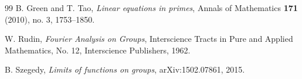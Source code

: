 \documentclass[11pt]{article}
\numberwithin{equation}{section}
\newcommand{\1}{\mathbf 1}
\begin{document}
\begin{thebibliography}{99}
B. Green and T. Tao,
\emph{Linear equations in primes},
Annals of Mathematics \textbf{171} (2010), no. 3, 1753--1850.

W. Rudin,
\emph{Fourier Analysis on Groups},
Interscience Tracts in Pure and Applied Mathematics, No. 12,
Interscience Publishers, 1962.

B. Szegedy,
\emph{Limits of functions on groups},
arXiv:1502.07861, 2015.

\end{thebibliography}
\end{document}
